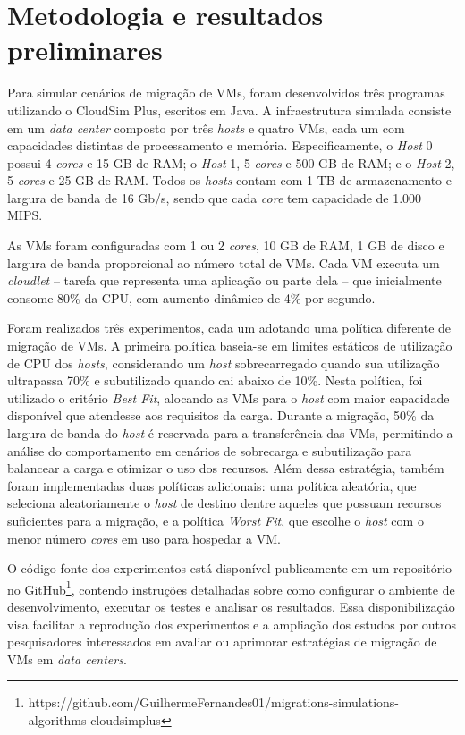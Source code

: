 \documentclass[12pt]{article}
\begin{document}
\section{Metodologia e resultados preliminares}

Para simular cenários de migração de VMs, foram desenvolvidos três programas utilizando o CloudSim Plus, escritos em Java. A infraestrutura simulada consiste em um \textit{data center} composto por três \textit{hosts} e quatro VMs, cada um com capacidades distintas de processamento e memória. Especificamente, o \textit{Host} 0 possui 4 \textit{cores} e 15 GB de RAM; o \textit{Host} 1, 5 \textit{cores} e 500 GB de RAM; e o \textit{Host} 2, 5 \textit{cores} e 25 GB de RAM. Todos os \textit{hosts} contam com 1 TB de armazenamento e largura de banda de 16 Gb/s, sendo que cada \textit{core} tem capacidade de 1.000 MIPS.

As VMs foram configuradas com 1 ou 2 \textit{cores}, 10 GB de RAM, 1 GB de disco e largura de banda proporcional ao número total de VMs. Cada VM executa um \textit{cloudlet} -- tarefa que representa uma aplicação ou parte dela -- que inicialmente consome 80\% da CPU, com aumento dinâmico de 4\% por segundo.

Foram realizados três experimentos, cada um adotando uma política diferente de migração de VMs. A primeira política baseia-se em limites estáticos de utilização de CPU dos \textit{hosts}, considerando um \textit{host} sobrecarregado quando sua utilização ultrapassa 70\% e subutilizado quando cai abaixo de 10\%. Nesta política, foi utilizado o critério \textit{Best Fit}, alocando as VMs para o \textit{host} com maior capacidade disponível que atendesse aos requisitos da carga. Durante a migração, 50\% da largura de banda do \textit{host} é reservada para a transferência das VMs, permitindo a análise do comportamento em cenários de sobrecarga e subutilização para balancear a carga e otimizar o uso dos recursos. Além dessa estratégia, também foram implementadas duas políticas adicionais: uma política aleatória, que seleciona aleatoriamente o \textit{host} de destino dentre aqueles que possuam recursos suficientes para a migração, e a política \textit{Worst Fit}, que escolhe o \textit{host} com o menor número \textit{cores} em uso para hospedar a VM.

O código-fonte dos experimentos está disponível publicamente em um repositório no GitHub\footnote{https://github.com/GuilhermeFernandes01/migrations-simulations-algorithms-cloudsimplus}, contendo instruções detalhadas sobre como configurar o ambiente de desenvolvimento, executar os testes e analisar os resultados. Essa disponibilização visa facilitar a reprodução dos experimentos e a ampliação dos estudos por outros pesquisadores interessados em avaliar ou aprimorar estratégias de migração de VMs em \textit{data centers}.
\end{document}
